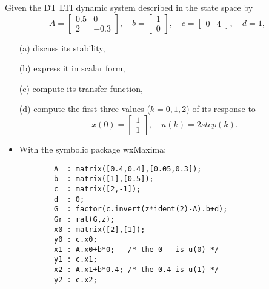 \begin{frame}
\myPause
 Given the DT LTI dynamic system described in the state space by
 \begin{displaymath}
  A = \begin{bmatrix} 0.5 & 0 \\ 2 & -0.3 \end{bmatrix}, \quad
  b = \begin{bmatrix} 1 \\ 0 \end{bmatrix}, \quad
  c = \begin{bmatrix} 0 & 4 \end{bmatrix}, \quad
  d = 1,
 \end{displaymath}
 \begin{itemize}[<+-| alert@+>]
 \item[(a)] discuss its stability,
 \item[(b)] express it in scalar form,
 \item[(c)] compute its transfer function,
 \item[(d)] compute the first three values ($k=0,1,2$) of its response to
            \begin{displaymath}
             x(0) = \begin{bmatrix} 1 \\ 1 \end{bmatrix}, \quad
             u(k) = 2 step(k).
            \end{displaymath}
 \end{itemize}
\end{frame}

\begin{frame}[fragile]
\framesubtitleTC{}
\myPause
 \begin{itemize}[<+-| alert@+>]
 \item With the symbolic package wxMaxima:
       \begin{verbatim}
        A  : matrix([0.4,0.4],[0.05,0.3]);
        b  : matrix([1],[0.5]);
        c  : matrix([2,-1]);
        d  : 0;
        G  : factor(c.invert(z*ident(2)-A).b+d);
        Gr : rat(G,z);
        x0 : matrix([2],[1]);
        y0 : c.x0;
        x1 : A.x0+b*0;   /* the 0   is u(0) */
        y1 : c.x1;
        x2 : A.x1+b*0.4; /* the 0.4 is u(1) */
        y2 : c.x2;
       \end{verbatim}

 \end{itemize}
\end{frame}

